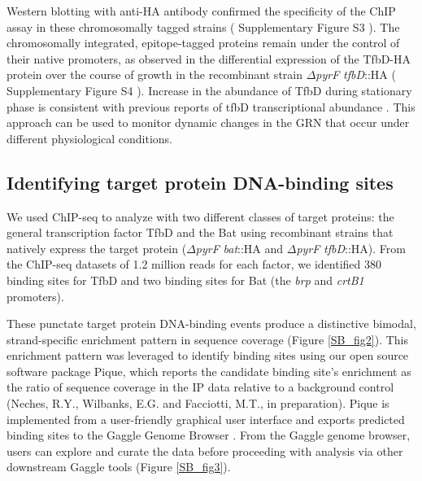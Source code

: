 Western blotting with anti-HA antibody confirmed the specificity of the ChIP assay in these chromosomally tagged strains ( Supplementary Figure S3 ). The chromosomally integrated, epitope-tagged proteins remain under the control of their native promoters, as observed in the differential expression of the TfbD-HA protein over the course of growth in the recombinant strain $\Delta${\em pyrF} {\em tfbD}::HA ( Supplementary Figure S4 ). Increase in the abundance of TfbD during stationary phase is consistent with previous reports of tfbD transcriptional abundance \cite{facciotti2010large}. This approach can be used to monitor dynamic changes in the GRN that occur under different physiological conditions.

\subsection{Identifying target protein DNA-binding sites}

We used ChIP-seq to analyze with two different classes of target proteins: the general transcription factor TfbD and the Bat using recombinant strains that natively express the target protein ($\Delta${\em pyrF} {\em bat}::HA and $\Delta${\em pyrF} {\em tfbD}::HA). From the ChIP-seq datasets of 1.2 million reads for each factor, we identified 380 binding sites for TfbD and two binding sites for Bat (the {\em brp} and {\em crtB1} promoters).

These punctate target protein DNA-binding events produce a distinctive bimodal, strand-specific enrichment pattern in sequence coverage (Figure \ref{SB_fig2}). This enrichment pattern was leveraged to identify binding sites using our open source software package Pique, which reports the candidate binding site's enrichment as the ratio of sequence coverage in the IP data relative to a background control (Neches, R.Y., Wilbanks, E.G. and Facciotti, M.T., in preparation). Pique is implemented from a user-friendly graphical user interface and exports predicted binding sites to the Gaggle Genome Browser \cite{bare_integration_2010}. From the Gaggle genome browser, users can explore and curate the data before proceeding with analysis via other downstream Gaggle tools (Figure \ref{SB_fig3}).

